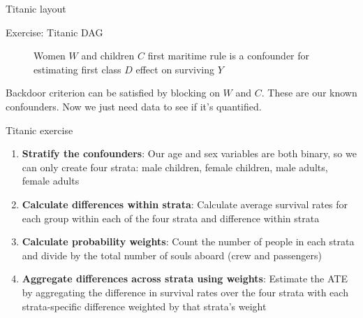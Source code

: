 \documentclass{beamer}
\begin{document}
\begin{frame}{Titanic layout}
  \begin{figure}
  \end{figure}
\end{frame}



\begin{frame}{Exercise: Titanic DAG}

\begin{figure}
\begin{center}
\caption{Women $W$ and children $C$ first maritime rule is a confounder for estimating first class $D$ effect on surviving $Y$}
\label{fig:titanic}
\end{center}
\end{figure}

\bigskip

Backdoor criterion can be satisfied by blocking on $W$ and $C$.  These are our known confounders.  Now we just need data to see if it's quantified.

\end{frame}

\begin{frame}{Titanic exercise}

\begin{enumerate}
\item \textbf{Stratify the confounders}: Our age and sex variables are both binary, so we can only create four strata: male children, female children, male adults, female adults
\item \textbf{Calculate differences within strata}: Calculate average survival rates for each group within each of the four strata and difference within strata
\item \textbf{Calculate probability weights}: Count the number of people in each strata and divide by the total number of souls aboard (crew and passengers)
\item \textbf{Aggregate differences across strata using weights}: Estimate the ATE by aggregating the difference in survival rates over the four strata with each strata-specific difference weighted by that strata's weight
\end{enumerate}


\end{frame}
\end{document}
